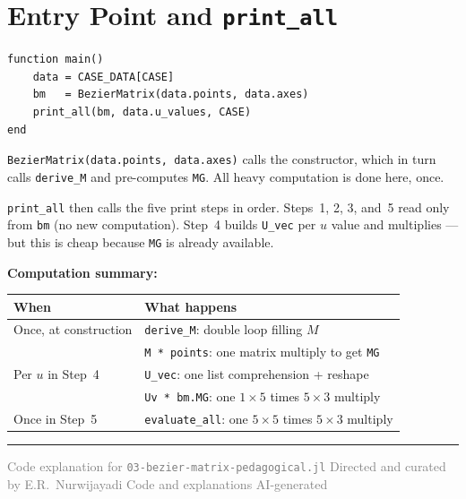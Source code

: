 \documentclass[12pt, a4paper]{article}
\newcommand{\cd}[1]{\texttt{#1}}
\begin{document}
\section{Entry Point and \texttt{print\_all}}

\begin{verbatim}
function main()
    data = CASE_DATA[CASE]
    bm   = BezierMatrix(data.points, data.axes)
    print_all(bm, data.u_values, CASE)
end
\end{verbatim}

\cd{BezierMatrix(data.points, data.axes)} calls the constructor,
which in turn calls \cd{derive\_M} and pre-computes \cd{MG}.
All heavy computation is done here, once.

\cd{print\_all} then calls the five print steps in order.
Steps~1, 2, 3, and~5 read only from \cd{bm} (no new computation).
Step~4 builds \cd{U\_vec} per $u$ value and multiplies ---
but this is cheap because \cd{MG} is already available.

\begin{notebox}
\textbf{Computation summary:}

\medskip
\begin{tabular}{lp{8cm}}
\toprule
When & What happens \\
\midrule
Once, at construction &
  \cd{derive\_M}: double loop filling $M$ \\
  & \cd{M * points}: one matrix multiply to get \cd{MG} \\[4pt]
Per $u$ in Step~4 &
  \cd{U\_vec}: one list comprehension + reshape \\
  & \cd{Uv * bm.MG}: one $1 \times 5$ times $5 \times 3$ multiply \\[4pt]
Once in Step~5 &
  \cd{evaluate\_all}: one $5 \times 5$ times $5 \times 3$ multiply \\
\bottomrule
\end{tabular}
\end{notebox}

\vspace{2em}\hrule\vspace{0.5em}
{\small\textcolor{gray}{%
Code explanation for \texttt{03-bezier-matrix-pedagogical.jl}
\textbar{} Directed and curated by E.R.\ Nurwijayadi
\textbar{} Code and explanations AI-generated}}
\end{document}
